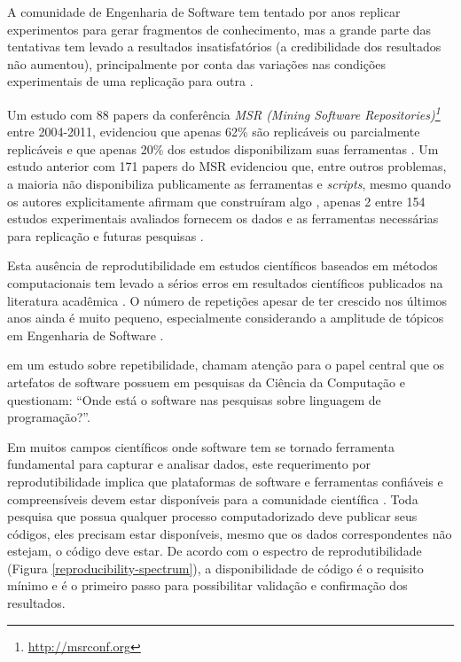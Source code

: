 A comunidade de Engenharia de Software tem tentado por anos replicar
experimentos para gerar fragmentos de conhecimento, mas a grande parte
das tentativas tem levado a resultados insatisfatórios (a
credibilidade dos resultados não aumentou), principalmente por conta das
variações nas condições experimentais de uma replicação para outra
\cite{juristo_using_2009}.

Um estudo com 88 papers da conferência {\it MSR (Mining Software Repositories)\footnote{\url{http://msrconf.org}}}
 entre 2004-2011, evidenciou que apenas
62\% são replicáveis ou parcialmente replicáveis e que apenas 20\% dos estudos
disponibilizam suas ferramentas \cite{amann2015software}. Um estudo anterior
com 171 papers do MSR evidenciou que, entre outros problemas, a maioria não
disponibiliza publicamente as ferramentas e {\it scripts}, mesmo quando os autores
explicitamente afirmam que construíram algo \cite{robles2010replicating},
apenas 2 entre 154 estudos experimentais avaliados fornecem os dados e as
ferramentas necessárias para replicação e futuras pesquisas
\cite{barr_shoulders_2010}.

Esta ausência de reprodutibilidade
em estudos científicos baseados em métodos computacionais tem
levado a sérios erros em resultados científicos publicados na literatura acadêmica
\cite{hinsen_activepapers_2015}. O número de repetições apesar de ter crescido nos últimos
anos ainda é muito pequeno, especialmente
considerando a amplitude de tópicos em Engenharia de Software
\cite{silva_replication_2011, kitchenham_evidence-based_2015}.

 em um estudo sobre repetibilidade, chamam
atenção para o papel central que os artefatos de software possuem em pesquisas
da Ciência da Computação e questionam: ``Onde está o software nas pesquisas
sobre linguagem de programação?''.

Em muitos campos científicos onde software tem se tornado ferramenta
fundamental para capturar e analisar dados, este requerimento por
reprodutibilidade implica que plataformas de software e ferramentas confiáveis
e compreensíveis devem estar disponíveis para a comunidade científica
\cite{mccormick_itk_2014}. Toda pesquisa que possua qualquer processo
computadorizado deve publicar seus códigos, eles precisam estar disponíveis,
mesmo que os dados correspondentes não estejam, o código deve estar. De acordo
com o espectro de reprodutibilidade (Figura \ref{reproducibility-spectrum}), a
disponibilidade de código é o requisito mínimo e é o primeiro passo para
possibilitar validação e confirmação dos resultados.

